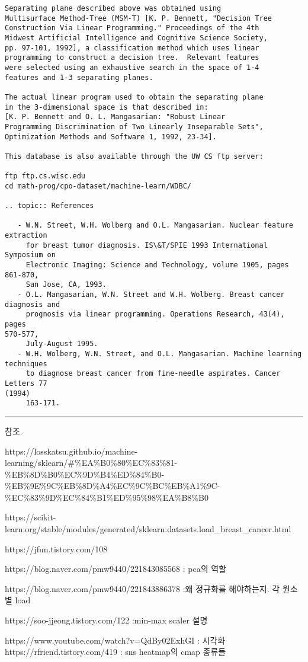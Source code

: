\documentclass[11pt]{article}
\begin{document}
\begin{Verbatim}[commandchars=\\\{\}]
Separating plane described above was obtained using
Multisurface Method-Tree (MSM-T) [K. P. Bennett, "Decision Tree
Construction Via Linear Programming." Proceedings of the 4th
Midwest Artificial Intelligence and Cognitive Science Society,
pp. 97-101, 1992], a classification method which uses linear
programming to construct a decision tree.  Relevant features
were selected using an exhaustive search in the space of 1-4
features and 1-3 separating planes.

The actual linear program used to obtain the separating plane
in the 3-dimensional space is that described in:
[K. P. Bennett and O. L. Mangasarian: "Robust Linear
Programming Discrimination of Two Linearly Inseparable Sets",
Optimization Methods and Software 1, 1992, 23-34].

This database is also available through the UW CS ftp server:

ftp ftp.cs.wisc.edu
cd math-prog/cpo-dataset/machine-learn/WDBC/

.. topic:: References

   - W.N. Street, W.H. Wolberg and O.L. Mangasarian. Nuclear feature extraction
     for breast tumor diagnosis. IS\&T/SPIE 1993 International Symposium on
     Electronic Imaging: Science and Technology, volume 1905, pages 861-870,
     San Jose, CA, 1993.
   - O.L. Mangasarian, W.N. Street and W.H. Wolberg. Breast cancer diagnosis and
     prognosis via linear programming. Operations Research, 43(4), pages
570-577,
     July-August 1995.
   - W.H. Wolberg, W.N. Street, and O.L. Mangasarian. Machine learning
techniques
     to diagnose breast cancer from fine-needle aspirates. Cancer Letters 77
(1994)
     163-171.
    \end{Verbatim}

    \begin{center}\rule{0.5\linewidth}{0.5pt}\end{center}

참조.

https://losskatsu.github.io/machine-learning/sklearn/\#\%EA\%B0\%80\%EC\%83\%81-\%EB\%8D\%B0\%EC\%9D\%B4\%ED\%84\%B0-\%EB\%9E\%9C\%EB\%8D\%A4\%EC\%9C\%BC\%EB\%A1\%9C-\%EC\%83\%9D\%EC\%84\%B1\%ED\%95\%98\%EA\%B8\%B0

https://scikit-learn.org/stable/modules/generated/sklearn.datasets.load\_breast\_cancer.html

https://jfun.tistory.com/108

https://blog.naver.com/pmw9440/221843085568 : pca의 역할

https://blog.naver.com/pmw9440/221843886378 :왜 정규화를 해야하는지. 각
원소별 load

https://soo-jjeong.tistory.com/122 :min-max scaler 설명

https://www.youtube.com/watch?v=QdBy02ExhGI : 시각화
https://rfriend.tistory.com/419 : sns heatmap의 cmap 종류들


    
    
    
\end{document}
